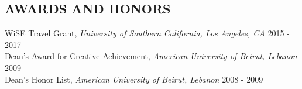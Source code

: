 \documentclass[11pt]{res-modified}
\begin{document}
\begin{resume}
\section{AWARDS AND HONORS}
\vspace{1mm}
{WiSE Travel Grant}, \textit{University of Southern California, Los Angeles, CA} \hfill 2015 - 2017 \\
{Dean's Award for Creative Achievement}, \textit{American University of Beirut, Lebanon} \hfill 2009 \\
{Dean's Honor List}, \textit{American University of Beirut, Lebanon} \hfill 2008 - 2009

\end{resume}
\end{document}
